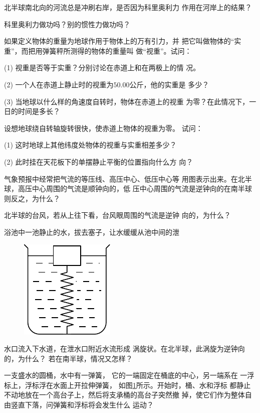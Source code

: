 \begin{questions}

\question 北半球南北向的河流总是冲刷右岸，是否因为科里奥利力
作用在河岸上的结果？

\question 科里奥利力做功吗？别的惯性力做功吗？

\question 如果定义物体的重量为地球作用于物体上的万有引力，并
把它叫做物体的“实重”，而把用弹簧秤所测得的物体的重量叫
做“视重”。试问：

(1) 视重是否等于实重？分别讨论在赤道上和在两极上的情
况。

(2) 一个人在赤道上静止时的视重为$ 50.00 $公斤，他的实重是
多少？

(3) 当地球以什么样的角速度自转时，物体在赤道上的视重
为零？在此情况下，一日的时间是多长？

\question 设想地球绕自转轴旋转很快，使赤道上物体的视重为零。
试问：

(1) 这时地球上其他纬度处物体的视重与实重相差多少？

(2) 此时挂在天花板下的单摆静止平衡的位置指向什么方
向？

\question 气象预报中经常把气流的等压线、高压中心、低压中心等
用图表示出来。在北半球，高压中心周围的气流是顺钟向的，低
压中心周围的气流是逆钟向的在南半球则反之，为什么？

\question 北半球的台风，若从上往下看，台风眼周围的气流是逆钟
向的，为什么？

\question 浴池中一池静止的水，拔去塞子，让水缓缓从池中间的泄
\begin{figure}
    \vspace{-0.8em}
    \centering
    \includegraphics{figure/fig12.14}
    \caption{}
    \label{fig:12.14}
\end{figure}
水口流入下水道，在泄水口附近水流形成
涡旋状。在北半球，此涡旋为逆钟向的，为什么？
若在南半球，情况又怎样？

\question 一支盛水的圆桶，水中有一弹簧，
它的一端固定在桶底的中心，另一端系在
一浮标上，浮标浮在水面上开拉伸弹簧，
如图\ref{fig:12.14}所示。开始时，桶、水和浮标
都静止不动地放在一个高台子上，然后将支承桶的高台子突然撤
掉，使它们作为整体自由竖直下落，问弹簧和浮标将会发生什么
运动？

\end{questions}
